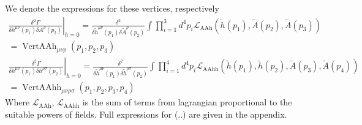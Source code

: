 \documentclass[11pt, a4paper]{article}
\begin{document}
We denote the expressions for these vertices, respectively
\begin{gather}
    \left. \frac{\delta^2 \Gamma}{\delta h^{\mu\nu}(p_1) \delta A^{\rho}(p_2)}\right|_{h=0} = \frac{\delta^2}{\delta \tilde{h}^{\mu\nu}(p_1) \delta \tilde{A}^{\rho}(p_2)} \int \prod_{i=1}^3 d^4 p_i \mathcal{L}_{\text{AAh}}\left(\tilde{h}(p_1), \tilde{A}(p_2), \tilde{A}(p_3)\right)\\
    = \operatorname{VertAAh}_{\mu\nu\rho}(p_1,p_2,p_3)\\
    \left. \frac{\delta^2 \Gamma}{\delta h^{\mu\nu}(p_1) \delta h^{\rho\sigma}(p_2)}\right|_{h=0} = \frac{\delta^2}{\delta \tilde{h}^{\mu\nu}(p_1) \delta \tilde{h}^{\rho\sigma}(p_2)} \int \prod_{i=1}^4 d^4 p_i \mathcal{L}_{\text{AAhh}}\left(\tilde{h}(p_1), \tilde{h}(p_2), \tilde{A}(p_3), \tilde{A}(p_4) \right)\\
     = \operatorname{VertAAhh}_{\mu\nu\rho\sigma}(p_1,p_2,p_3,p_4)
\end{gather}
Where $\mathcal{L}_{\text{AAh}}$, $\mathcal{L}_{\text{AAhh}}$ is the sum of terms from lagrangian proportional to the suitable powers of fields.
Full expressions for (..) are given in the appendix.





\end{document}
